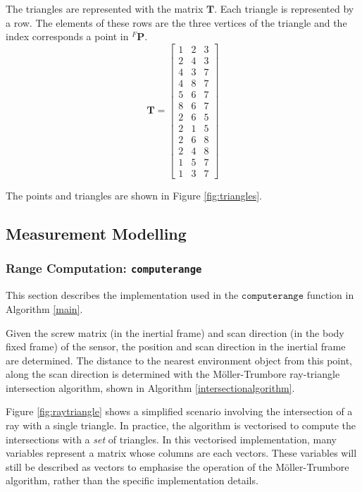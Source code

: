 The triangles are represented with the matrix $\mathbf{T}$. Each triangle is represented by a row. The elements of these rows are the three vertices of the triangle and the index corresponds a point in ${^{F}\mathbf{P}}$.
\begin{equation}
	\mathbf{T} = 
	\begin{bmatrix}
	1 & 2 & 3 \\
	2 & 4 & 3 \\
    4 & 3 & 7 \\
    4 & 8 & 7 \\
    5 & 6 & 7 \\
    8 & 6 & 7 \\
    2 & 6 & 5 \\
    2 & 1 & 5 \\
    2 & 6 & 8 \\
    2 & 4 & 8 \\
    1 & 5 & 7 \\
    1 & 3 & 7
	\end{bmatrix}
\end{equation}

The points and triangles are shown in Figure \ref{fig:triangles}.


\subsection{Measurement Modelling}
	\subsubsection{Range Computation: \texttt{computerange}}
	This section describes the implementation used in the $\texttt{computerange}$ function in Algorithm \ref{main}.
	
	Given the screw matrix (in the inertial frame) and scan direction (in the body fixed frame) of the sensor, the position and scan direction in the inertial frame are determined.
	The distance to the nearest environment object from this point, along the scan direction is determined with the M{\"o}ller-Trumbore ray-triangle intersection algorithm, shown in Algorithm \ref{intersectionalgorithm}.
	
	Figure \ref{fig:raytriangle} shows a simplified scenario involving the intersection of a ray with a single triangle. In practice, the algorithm is vectorised to compute the intersections with a \textit{set} of triangles. In this vectorised implementation, many variables represent a matrix whose columns are each vectors. These variables will still be described as vectors to emphasise the operation of the M{\"o}ller-Trumbore algorithm, rather than the specific implementation details.	
	
